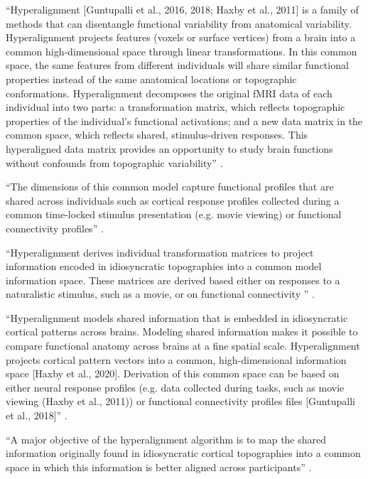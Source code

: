 %
``Hyperalignment [Guntupalli et al., 2016, 2018; Haxby et al., 2011] is a family
of methods that can disentangle functional variability from anatomical
variability. Hyperalignment projects features (voxels or surface vertices) from
a brain into a common high-dimensional space through linear transformations. In
this common space, the same features from different individuals will share
similar functional properties instead of the same anatomical locations or
topographic conformations. Hyperalignment decomposes the original fMRI data of
each individual into two parts: a transformation matrix, which reflects
topographic properties of the individual's functional activations; and a new
data matrix in the common space, which reflects shared, stimulus-driven
responses. This hyperaligned data matrix provides an opportunity to study brain
functions without confounds from topographic variability''
\citep{feilong2018reliable}.

%
``The dimensions of this common model capture functional profiles that are
shared across individuals such as cortical response profiles collected during a
common time-locked stimulus presentation (e.g. movie viewing) or functional
connectivity profiles'' \citep{busch2021hybrid}.

%
``Hyperalignment derives individual transformation matrices to project
information encoded in idiosyncratic topographies into a common model
information space. These matrices are derived based either on responses to a
naturalistic stimulus, such as a movie, or on functional connectivity
\citep{guntupalli2018computational}'' \citep{jiahui2020predicting}.

%
``Hyperalignment models shared information that is embedded in idiosyncratic
cortical patterns across brains. Modeling shared information makes it possible
to compare functional anatomy across brains at a fine spatial scale.
Hyperalignment projects cortical pattern vectors into a common, high-dimensional
information space [Haxby et al., 2020]. Derivation of this common space can be
based on either neural response profiles (e.g. data collected during tasks, such
as movie viewing (Haxby et al., 2011)) or functional connectivity profiles files
[Guntupalli et al., 2018]'' \citep{busch2021hybrid}.

%
``A major objective of the hyperalignment algorithm is to map the shared
information originally found in idiosyncratic cortical topographies into a
common space in which this information is better aligned across participants''
\citep{busch2021hybrid}.


